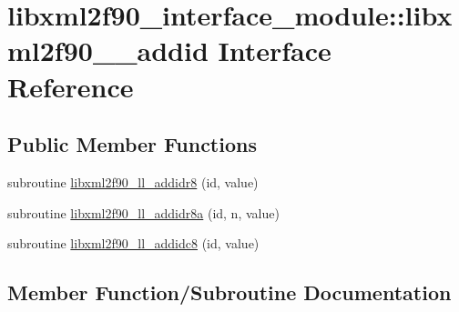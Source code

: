 \hypertarget{interfacelibxml2f90__interface__module_1_1libxml2f90____addid}{}\section{libxml2f90\+\_\+interface\+\_\+module\+:\+:libxml2f90\+\_\+\+\_\+addid Interface Reference}
\label{interfacelibxml2f90__interface__module_1_1libxml2f90____addid}
\subsection*{Public Member Functions}
\begin{DoxyCompactItemize}
\item 
subroutine \hyperlink{interfacelibxml2f90__interface__module_1_1libxml2f90____addid_acecc86afe5b5de9df74cfb9d4baf129a}{libxml2f90\+\_\+ll\+\_\+addidr8} (id, value)
\item 
subroutine \hyperlink{interfacelibxml2f90__interface__module_1_1libxml2f90____addid_abb6ee1f76f80fab72d6b6e6c9ed66a66}{libxml2f90\+\_\+ll\+\_\+addidr8a} (id, n, value)
\item 
subroutine \hyperlink{interfacelibxml2f90__interface__module_1_1libxml2f90____addid_af7590af77ac066d6e26441bda793a88c}{libxml2f90\+\_\+ll\+\_\+addidc8} (id, value)
\end{DoxyCompactItemize}


\subsection{Member Function/\+Subroutine Documentation}
\hypertarget{interfacelibxml2f90__interface__module_1_1libxml2f90____addid_af7590af77ac066d6e26441bda793a88c}{}
